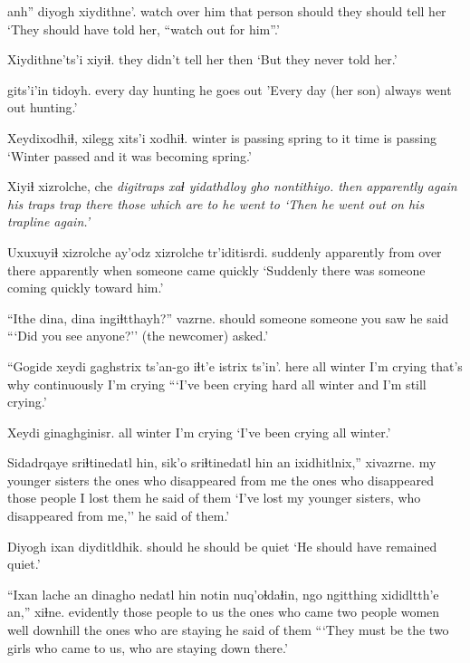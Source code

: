 \documentclass[12pt]{article}
\begin{document}
 anh'' diyogh xiydithne'.
{watch over him} {that person} should {they should tell her}
\glt `They should have told her, ``watch out for him''.'
\glend

\gll Xiydithne'ts'i xiyiɬ.
{they didn't tell her} then 
\glt `But they never told her.'
\glend

 gits'i'in tidoyh.
{every day} hunting {he goes out}
\glt  'Every day (her son) always went out hunting.'
\glend

\gll Xeydixodhiɬ, xilegg xits'i xodhiɬ.
{winter is passing} spring {to it} {time is passing}
\glt `Winter passed and it was becoming spring.'
\glend

\gll Xiyiɬ xizrolche, che \em digi\em traps xaɬ yidathdloy gho nontithiyo.
then apparently again {his traps} trap there {those which are} to {he went to}
\glt `Then he went out on his trapline again.'
\glend

\gll Uxuxuyiɬ xizrolche ay'odz xizrolche tr'iditisrdi.
suddenly apparently {from over there} apparently {when someone came quickly}
\glt `Suddenly there was someone coming quickly toward him.'
\glend

\gll ``Ithe dina, dina ingiɬtthayh?'' vazrne.
should someone someone {you saw} {he said}
\glt ```Did you see anyone?'' (the newcomer) asked.'
\glend

\gll ``Gogide xeydi gaghstrix ts'an-go iɬt'e istrix ts'in'. 
here {all winter} {I'm crying} {that's why} continuously {I'm crying} {}
\glt ```I've been crying hard all winter and I'm still crying.'
\glend

\gll Xeydi ginaghginisr.
{all winter} {I'm crying}
\glt `I've been crying all winter.'
\glend

\gll Sidadrqaye {sriɬtinedatl hin}, sik'o {sriɬtinedatl hin} an ixidhitlnix,'' xivazrne.
{my younger sisters} {the ones who disappeared} {from me} {the ones who disappeared} {those people} {I lost them} {he said of them}
\glt `I've lost my younger sisters, who disappeared from me,'' he said of them.'
\glend

\gll Diyogh ixan diyditldhik.
should {} {he should be quiet} 
\glt `He should have remained quiet.'
\glend

\gll ``Ixan lache an dinagho {nedatl hin} notin nuq'oɬdaɬin, ngo ngitthing {xididltth'e an},'' xiɬne.
{} evidently {those people} {to us} {the ones who came} {two people} women well downhill {the ones who are staying} {he said of them} 
\glt ```They must be the two girls who came to us, who are staying down there.'
\glend
\end{document}
